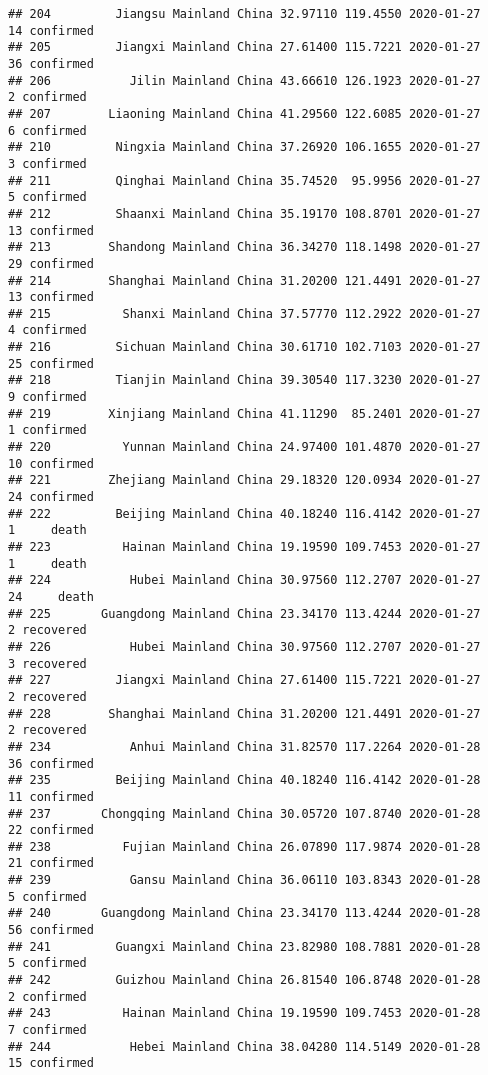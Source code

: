 \documentclass[
]{article}
\begin{document}
\begin{verbatim}
## 204         Jiangsu Mainland China 32.97110 119.4550 2020-01-27    14 confirmed
## 205         Jiangxi Mainland China 27.61400 115.7221 2020-01-27    36 confirmed
## 206           Jilin Mainland China 43.66610 126.1923 2020-01-27     2 confirmed
## 207        Liaoning Mainland China 41.29560 122.6085 2020-01-27     6 confirmed
## 210         Ningxia Mainland China 37.26920 106.1655 2020-01-27     3 confirmed
## 211         Qinghai Mainland China 35.74520  95.9956 2020-01-27     5 confirmed
## 212         Shaanxi Mainland China 35.19170 108.8701 2020-01-27    13 confirmed
## 213        Shandong Mainland China 36.34270 118.1498 2020-01-27    29 confirmed
## 214        Shanghai Mainland China 31.20200 121.4491 2020-01-27    13 confirmed
## 215          Shanxi Mainland China 37.57770 112.2922 2020-01-27     4 confirmed
## 216         Sichuan Mainland China 30.61710 102.7103 2020-01-27    25 confirmed
## 218         Tianjin Mainland China 39.30540 117.3230 2020-01-27     9 confirmed
## 219        Xinjiang Mainland China 41.11290  85.2401 2020-01-27     1 confirmed
## 220          Yunnan Mainland China 24.97400 101.4870 2020-01-27    10 confirmed
## 221        Zhejiang Mainland China 29.18320 120.0934 2020-01-27    24 confirmed
## 222         Beijing Mainland China 40.18240 116.4142 2020-01-27     1     death
## 223          Hainan Mainland China 19.19590 109.7453 2020-01-27     1     death
## 224           Hubei Mainland China 30.97560 112.2707 2020-01-27    24     death
## 225       Guangdong Mainland China 23.34170 113.4244 2020-01-27     2 recovered
## 226           Hubei Mainland China 30.97560 112.2707 2020-01-27     3 recovered
## 227         Jiangxi Mainland China 27.61400 115.7221 2020-01-27     2 recovered
## 228        Shanghai Mainland China 31.20200 121.4491 2020-01-27     2 recovered
## 234           Anhui Mainland China 31.82570 117.2264 2020-01-28    36 confirmed
## 235         Beijing Mainland China 40.18240 116.4142 2020-01-28    11 confirmed
## 237       Chongqing Mainland China 30.05720 107.8740 2020-01-28    22 confirmed
## 238          Fujian Mainland China 26.07890 117.9874 2020-01-28    21 confirmed
## 239           Gansu Mainland China 36.06110 103.8343 2020-01-28     5 confirmed
## 240       Guangdong Mainland China 23.34170 113.4244 2020-01-28    56 confirmed
## 241         Guangxi Mainland China 23.82980 108.7881 2020-01-28     5 confirmed
## 242         Guizhou Mainland China 26.81540 106.8748 2020-01-28     2 confirmed
## 243          Hainan Mainland China 19.19590 109.7453 2020-01-28     7 confirmed
## 244           Hebei Mainland China 38.04280 114.5149 2020-01-28    15 confirmed

\end{verbatim}
\end{document}
